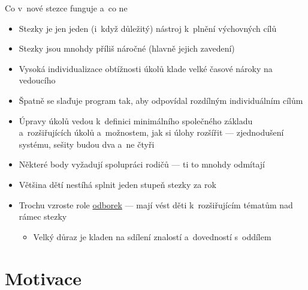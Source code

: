 \documentclass[compress, ucs, xelatex, xcolor=dvipsnames, print,
  hyperref={
    bookmarks=true,
    unicode=true,
    colorlinks=true,
    plainpages=false,
    pdfkeywords={Skaut, Junak, Skauting, Vychovna metoda},
    linkcolor=Black,
    anchorcolor=Black,
    citecolor=OliveGreen,
    filecolor=OliveGreen,
    menucolor=Black,
    urlcolor=OliveGreen,
    pdftex}
  ]{beamer}
\begin{document}
\begin{frame}{Co v~nové stezce funguje a~co ne}
  \begin{itemize}
    \item Stezky je jen jeden (i~když důležitý) nástroj k~plnění výchovných cílů
    \item Stezky jsou mnohdy příliš náročné (hlavně jejich zavedení)
    \item Vysoká individualizace obtížnosti úkolů klade velké časové nároky na vedoucího
    \item Špatně se slaďuje program tak, aby odpovídal rozdílným individuálním cílům
    \item Úpravy úkolů vedou k~definici minimálního společného základu a~rozšiřujících úkolů a~možnostem, jak si úlohy rozšířit --- zjednodušení systému, sešity budou dva a~ne čtyři
    \item Některé body vyžadují spolupráci rodičů --- ti to mnohdy odmítají
    \item Většina dětí nestíhá splnit jeden stupeň stezky za rok
    \item Trochu vzroste role \href{https://odborky.skauting.cz/}{odborek} --- mají vést děti k~rozšiřujícím tématům nad rámec stezky
    \begin{itemize}
      \item Velký důraz je kladen na sdílení znalostí a~dovedností s~oddílem
    \end{itemize}
  \end{itemize}
\end{frame}

\section{Motivace}
\end{document}
